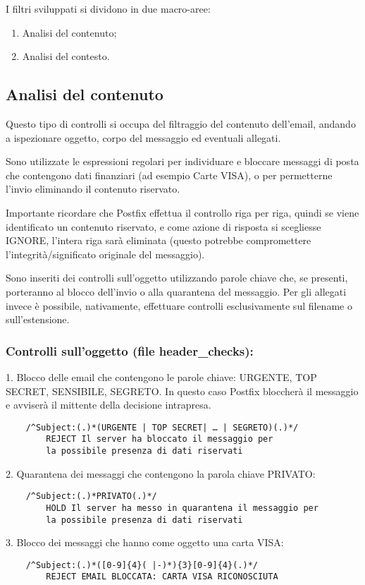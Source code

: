     I filtri sviluppati si dividono in due macro-aree:

    \begin{enumerate}
        \item Analisi del contenuto;
        \item Analisi del contesto.
    \end{enumerate}

    \subsection{Analisi del contenuto}
    Questo tipo di controlli si occupa del filtraggio del contenuto dell'email, 
    andando a ispezionare oggetto, corpo del messaggio ed eventuali allegati. 
    
    Sono utilizzate le espressioni regolari per individuare e bloccare messaggi di posta che contengono dati
    finanziari (ad esempio Carte VISA), o per permetterne l’invio eliminando il contenuto riservato. 
    
    Importante ricordare che Postfix effettua il controllo riga per riga, quindi se viene identificato un 
    contenuto riservato, e come azione di risposta si scegliesse IGNORE, 
    l’intera riga sarà eliminata (questo potrebbe compromettere l’integrità/significato originale del messaggio). 
    
    Sono inseriti dei controlli sull’oggetto utilizzando parole chiave che, se presenti, 
    porteranno al blocco dell’invio o alla quarantena del messaggio. Per gli allegati invece è possibile, nativamente,
    effettuare controlli esclusivamente sul filename o sull’estensione. 

    \subsubsection{Controlli sull'oggetto (file header\_checks):}

    1. Blocco delle email che contengono le parole chiave: URGENTE, TOP SECRET, SENSIBILE, SEGRETO.
    In questo caso Postfix bloccherà il messaggio e avviserà il mittente della decisione intrapresa.

    \begin{verbatim}
    /^Subject:(.)*(URGENTE | TOP SECRET| … | SEGRETO)(.)*/
        REJECT Il server ha bloccato il messaggio per 
        la possibile presenza di dati riservati
    \end{verbatim}
    2. Quarantena dei messaggi che contengono la parola chiave PRIVATO:
    \begin{verbatim}
    /^Subject:(.)*PRIVATO(.)*/
        HOLD Il server ha messo in quarantena il messaggio per 
        la possibile presenza di dati riservati
    \end{verbatim}
    3. Blocco dei messaggi che hanno come oggetto una carta VISA:
    \begin{verbatim}
    /^Subject:(.)*([0-9]{4}( |-)*){3}[0-9]{4}(.)*/
        REJECT EMAIL BLOCCATA: CARTA VISA RICONOSCIUTA
    \end{verbatim}


